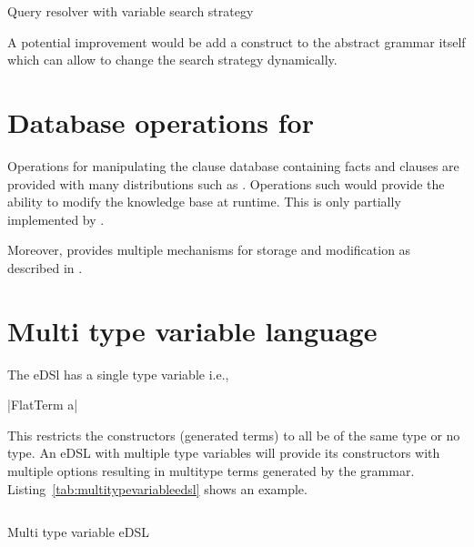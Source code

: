 \documentclass[thesis-solanki.tex]{subfiles}
\begin{document}
\begin{code-list}[H]
\begin{singlespace}
\inputminted{haskell}{haskell-proto4-query-resolver-variable-search-strat.hs}
\end{singlespace}
\caption{Query resolver with variable search strategy}
\label{tab:queryresolvervariablesearchstrat}
\end{code-list}  

A potential improvement would be add a construct to the abstract grammar itself which can allow to change the search strategy dynamically.

\section{Database operations for }
Operations for manipulating the clause database containing facts and clauses are provided with many  distributions such as
 \cite{website:swiprologdbops}. Operations such  \cite{website:assertzswiprolog} would provide
the ability to modify the knowledge base at runtime. This is only partially implemented by  \cite{prolog-lib}.

Moreover,  provides multiple mechanisms for storage and modification as described in \cite{website:swiprologdbops}.

\section{Multi type variable language}
The eDSl  has a single type variable i.e.,

|FlatTerm a|

This restricts the constructors (generated terms) to all be of the same type or no type. An eDSL with multiple type variables will provide
its constructors with multiple options resulting in multitype terms generated by the grammar. Listing~\ref{tab:multitypevariableedsl} shows 
an example.

\begin{code-list}[H]
\begin{singlespace}
\inputminted{haskell}{haskell-proto4-multi-type-variable-edsl.hs}
\end{singlespace}
\caption{Multi type variable eDSL}
\label{tab:multitypevariableedsl}
\end{code-list}
\end{document}
